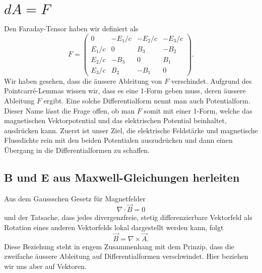 \section{$dA = F$
	\label{maxwell:section:dA}}
Den Faraday-Tensor haben wir definiert als
\begin{equation}
	F = \begin{pmatrix}
		0 & -E_1/c & -E_2/c & -E_3/c \\ E_1/c & 0 & B_3 & -B_2 \\ E_2/c & -B_3 & 0 & B_1 \\ E_3/c & B_2 & -B_1 & 0 
	\end{pmatrix}.
\end{equation}
Wir haben gesehen, dass die äussere Ableitung von $F$ verschindet.
Aufgrund des Pointcarré-Lemmas wissen wir, dass es eine 1-Form geben muss, deren äussere Ableitung $F$ ergibt.
Eine solche Differentialform nennt man auch Potentialform.
Dieser Name lässt die Frage offen, ob man $F$ somit mit einer 1-Form, welche das magnetischen Vektorpotential und das elektrischen Potential beinhaltet, ausdrücken kann.
Zuerst ist unser Ziel, die elektrische Feldstärke und magnetische Flussdichte rein mit den beiden Potentialen auszudrücken und dann einen Übergang in die Differentialformen zu schaffen. 

\subsection{B und E aus Maxwell-Gleichungen herleiten}
Aus dem Gaussschen Gesetz für Magnetfelder
\begin{equation*}
	\nabla \cdot \vec{B} = 0
\end{equation*}
und der Tatsache, dass jedes divergenzfreie, stetig differenzierbare Vektorfeld als Rotation eines anderen Vektorfelds lokal dargestellt werden kann,
folgt
\begin{equation*}
	\vec{B} = \nabla \times \vec{A}.
\end{equation*}
Diese Beziehung steht in engem Zusammenhang mit dem Prinzip, dass die zweifache äussere Ableitung auf Differentialformen verschwindet. Hier beziehen wir uns aber auf Vektoren.

